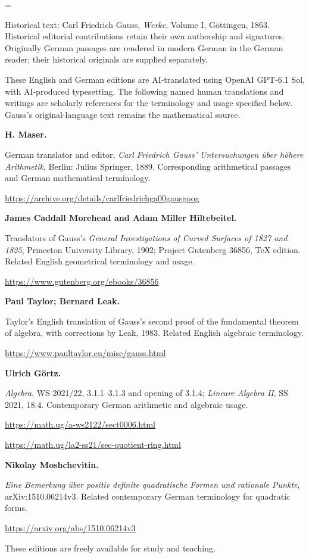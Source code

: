 \clearpage
\newcount\SavedTranslationPage
\SavedTranslationPage=\value{page}
\hypersetup{pageanchor=false}
\begingroup
\pagestyle{empty}\thispagestyle{empty}
\medskip
\small\raggedright
Historical text: Carl Friedrich Gauss, \emph{Werke}, Volume I, Göttingen, 1863. Historical editorial contributions retain their own authorship and signatures. Originally German passages are rendered in modern German in the German reader; their historical originals are supplied separately.

These English and German editions are AI-translated using OpenAI GPT-6.1 Sol, with AI-produced typesetting. The following named human translations and writings are scholarly references for the terminology and usage specified below. Gauss's original-language text remains the mathematical source.

\par\medskip\noindent\textbf{H. Maser.}\par\nobreak\smallskip\noindent German translator and editor, \emph{Carl Friedrich Gauss' Untersuchungen über höhere Arithmetik}, Berlin: Julius Springer, 1889. Corresponding arithmetical passages and German mathematical terminology.\par
\url{https://archive.org/details/carlfriedrichga00gausgoog}
\par\medskip\noindent\textbf{James Caddall Morehead and Adam Miller Hiltebeitel.}\par\nobreak\smallskip\noindent Translators of Gauss's \emph{General Investigations of Curved Surfaces of 1827 and 1825}, Princeton University Library, 1902; Project Gutenberg 36856, TeX edition. Related English geometrical terminology and usage.\par
\url{https://www.gutenberg.org/ebooks/36856}
\par\medskip\noindent\textbf{Paul Taylor; Bernard Leak.}\par\nobreak\smallskip\noindent Taylor's English translation of Gauss's second proof of the fundamental theorem of algebra, with corrections by Leak, 1983. Related English algebraic terminology.\par
\url{https://www.paultaylor.eu/misc/gauss.html}
\par\medskip\noindent\textbf{Ulrich Görtz.}\par\nobreak\smallskip\noindent \emph{Algebra}, WS 2021/22, 3.1.1–3.1.3 and opening of 3.1.4; \emph{Lineare Algebra II}, SS 2021, 18.4. Contemporary German arithmetic and algebraic usage.\par
\url{https://math.ug/a-ws2122/sect0006.html}\par
\url{https://math.ug/la2-ss21/sec-quotient-ring.html}
\par\medskip\noindent\textbf{Nikolay Moshchevitin.}\par\nobreak\smallskip\noindent \emph{Eine Bemerkung über positiv definite quadratische Formen und rationale Punkte}, arXiv:1510.06214v3. Related contemporary German terminology for quadratic forms.\par
\url{https://arxiv.org/abs/1510.06214v3}


\par These editions are freely available for study and teaching.\par

\clearpage\endgroup\clearpage
\setcounter{page}{\the\SavedTranslationPage}
\hypersetup{pageanchor=true}
